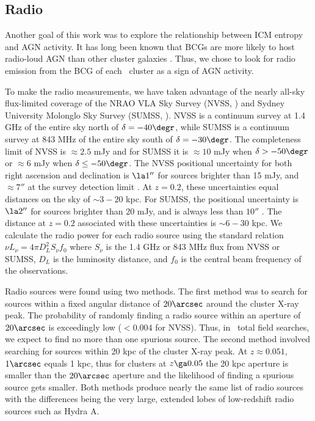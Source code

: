 \documentclass{emulateapj}
\begin{document}
\subsection{Radio}
\label{sec:radio}

Another goal of this work was to explore the relationship between ICM
entropy and AGN activity. It has long been known that BCGs are more
likely to host radio-loud AGN than other cluster galaxies
\citep{burns81, valentijn83, burns90}. Thus, we chose to look for
radio emission from the BCG of each \accept\ cluster as a sign of AGN
activity.

To make the radio measurements, we have taken advantage of the nearly
all-sky flux-limited coverage of the NRAO VLA Sky Survey (NVSS,
\citealt{nvss}) and Sydney University Molonglo Sky Survey (SUMSS,
\citealt{sumss1, sumss2}). NVSS is a continuum survey at 1.4 GHz of
the entire sky north of $\delta = -40\degr$, while SUMSS is a
continuum survey at 843 MHz of the entire sky south of $\delta =
-30\degr$. The completeness limit of NVSS is $\approx 2.5$ mJy and for
SUMSS it is $\approx 10$ mJy when $\delta > -50\degr$ or $\approx 6$
mJy when $\delta \leq -50\degr$. The NVSS positional uncertainty for
both right ascension and declination is $\la 1''$ for sources brighter
than 15 mJy, and $\approx 7''$ at the survey detection limit
\citep{nvss}. At $z=0.2$, these uncertainties equal distances on the
sky of $\sim3-20$ kpc. For SUMSS, the positional uncertainty is $\la
2''$ for sources brighter than 20 mJy, and is always less than $10''$
\citep{sumss1,sumss2}. The distance at $z=0.2$ associated with these
uncertainties is $\sim6-30$ kpc. We calculate the radio power for each
radio source using the standard relation $\nu L_{\nu} = 4 \pi D_L^2
S_{\nu} f_0$ where $S_{\nu}$ is the 1.4 GHz or 843 MHz flux from NVSS
or SUMSS, $D_L$ is the luminosity distance, and $f_0$ is the central
beam frequency of the observations.

Radio sources were found using two methods. The first method was to
search for sources within a fixed angular distance of $20\arcsec$
around the cluster X-ray peak. The probability of randomly finding a
radio source within an aperture of $20\arcsec$ is exceedingly low ($<
0.004$ for NVSS). Thus, in \clnum\ total field searches, we expect to
find no more than one spurious source. The second method involved
searching for sources within 20 kpc of the cluster X-ray peak. At $z
\approx 0.051$, $1\arcsec$ equals 1 kpc, thus for clusters at $z \ga
0.05$ the 20 kpc aperture is smaller than the $20\arcsec$ aperture and
the likelihood of finding a spurious source gets smaller. Both methods
produce nearly the same list of radio sources with the differences
being the very large, extended lobes of low-redshift radio sources
such as Hydra A.
\end{document}
